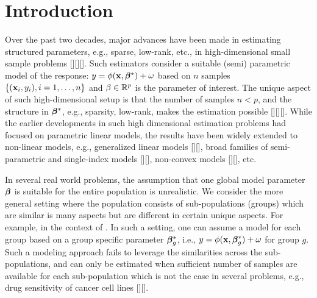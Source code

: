 
\section{Introduction}
Over the past two decades, major advances have been made in estimating structured parameters, e.g., sparse, low-rank, etc., in high-dimensional small sample problems [][][].
Such estimators consider a suitable (semi) parametric model of the response: $y = \phi(\mathbf{x},\boldsymbol{\beta}^*) + \omega$ based on $n$ samples $\{(\mathbf{x}_i,y_i),i=1,\ldots,n\}$ and $\beta \in \mathbb R^p$
is the parameter of interest. The unique aspect of such high-dimensional setup is that the number of samples $n < p$, and the structure in $\boldsymbol{\beta}^*$, e.g., sparsity, low-rank, makes
the estimation possible [][][]. While the earlier developments in such high dimensional estimation problems had focused on parametric linear models, the results
have been widely extended to non-linear models, e.g., generalized linear models [][], broad families of semi-parametric and single-index models [][], non-convex models [][], etc.

In several real world problems, the assumption that one global model parameter $\boldsymbol{\beta}$ is suitable for the entire population is unrealistic.
We consider the more general setting where the population consists of sub-populations (groups) which are similar is many aspects but are different in certain
unique aspects. For example, in the context of . 
%
%
In such a setting, one can assume a model for each group based on a group specific parameter $\boldsymbol{\beta}^*_g$, i.e., $y = \phi(\mathbf{x}, \boldsymbol{\beta}_g^*) + \omega$ for group $g$. 
Such a modeling approach fails to leverage the similarities across the sub-populations, and can only be estimated when sufficient number of samples are available 
for each sub-population which is not the case in several problems, e.g., drug sensitivity of cancer cell lines [][].
%

